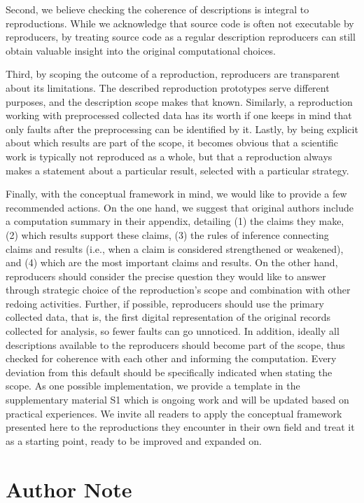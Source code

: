 \documentclass[authordate, meta]{jote-new-article}
\begin{document}
	Second, we believe checking the coherence of descriptions is integral to reproductions. While we acknowledge that source code is often not executable by reproducers, by treating source code as a regular description reproducers can still obtain valuable insight into the original computational choices. 
	
	Third, by scoping the outcome of a reproduction, reproducers are transparent about its limitations. The described reproduction prototypes serve different purposes, and the description scope makes that known. Similarly, a reproduction working with preprocessed collected data has its worth if one keeps in mind that only faults after the preprocessing can be identified by it. Lastly, by being explicit about which results are part of the scope, it becomes obvious that a scientific work is typically not reproduced as a whole, but that a reproduction always makes a statement about a particular result, selected with a particular strategy.


	Finally, with the conceptual framework in mind, we would like to provide a few recommended actions. On the one hand, we suggest that original authors include a computation summary in their appendix, detailing (1) the claims they make, (2) which results support these claims, (3) the rules of inference connecting claims and results (i.e., when a claim is considered strengthened or weakened), and (4) which are the most important claims and results. On the other hand, reproducers should consider the precise question they would like to answer through strategic choice of the reproduction's scope and combination with other redoing activities. Further, if possible, reproducers should use the primary collected data, that is, the first digital representation of the original records collected for analysis, so fewer faults can go unnoticed. In addition, ideally all descriptions available to the reproducers should become part of the scope, thus checked for coherence with each other and informing the computation. Every deviation from this default should be specifically indicated when stating the scope. As one possible implementation, we provide a template in the supplementary material  S1 which is ongoing work and will be updated based on practical experiences. We invite all readers to apply the conceptual framework presented here to the reproductions they encounter in their own field and treat it as a starting point, ready to be improved and expanded on.


	

	\section{Author Note}
\end{document}
